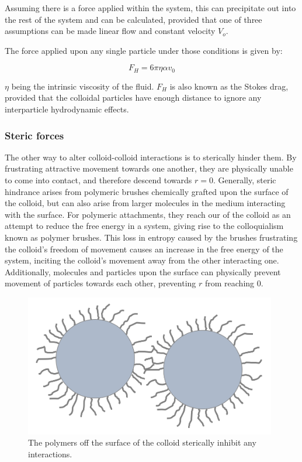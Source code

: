 Assuming there is a force applied within the system, this can precipitate out into the rest of the system and can be calculated, provided that one of three assumptions can be made linear flow and constant velocity \(V_o\). 

The force applied upon any single particle under those conditions is given by:

\begin{equation}
F_H = 6 \pi \eta \alpha v_0
\end{equation}

$\eta$ being the intrinsic viscosity of the fluid. $F_H$ is also known as the Stokes drag, provided that the colloidal particles have enough distance to ignore any interparticle hydrodynamic effects.\cite{?}

\subsubsection{Steric forces}


The other way to alter colloid-colloid interactions is to sterically hinder them. By frustrating attractive movement towards one another, they are physically unable to come into contact, and therefore descend towards $r = 0$. Generally, steric hindrance arises from polymeric brushes chemically grafted upon the surface of the colloid, but can also arise from larger molecules in the medium interacting with the surface. For polymeric attachments, they reach our of the colloid as an attempt to reduce the free energy in a system, giving rise to the colloquialism known as polymer brushes. This loss in entropy caused by the brushes frustrating the colloid's freedom of movement causes an increase in the free energy of the system, inciting the colloid's movement away from the other interacting one. Additionally, molecules and particles upon the surface can physically prevent movement of particles towards each other, preventing $r$ from reaching 0.\cite{?}

\begin{figure}[h]     %
        \begin{center}
          \includegraphics[width=110mm]{chapter1/brushy.PNG}
\end{center}
\caption{The polymers off the surface of the colloid sterically inhibit any interactions.}
\label{fig:brushy}                 %
\end{figure}

